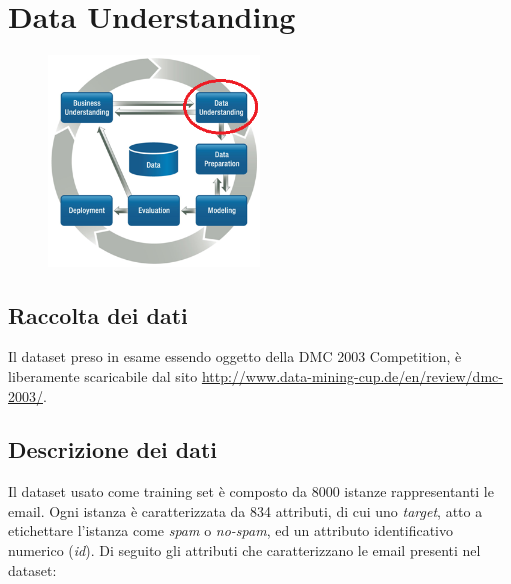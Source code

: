 \chapter{Data Understanding}
\begin{figure}[hbtp]
	\centering
	\includegraphics[width=0.5\textwidth]{./images/CRISPDM_2.png}
	\label{CRISPDM_2}
\end{figure}
\section{Raccolta dei dati}
Il dataset preso in esame essendo oggetto della DMC 2003 Competition, è liberamente scaricabile dal sito \url{http://www.data-mining-cup.de/en/review/dmc-2003/}. 

\section{Descrizione dei dati}
Il dataset usato come training set è composto da 8000 istanze rappresentanti le email. Ogni istanza è caratterizzata da 834 attributi, di cui uno \textit{target}, atto a etichettare l'istanza come \textit{spam} o \textit{no-spam}, ed un attributo identificativo numerico (\textit{id}). Di seguito gli attributi che caratterizzano le email presenti nel dataset:

